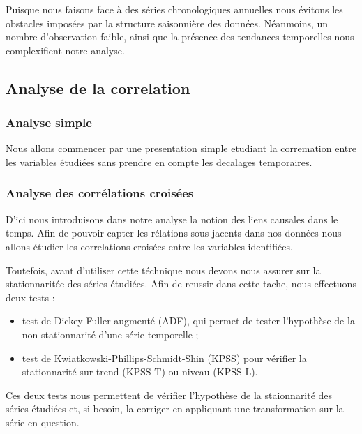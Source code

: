 \documentclass[11pt,]{article}
\providecommand{\tightlist}{%
  \setlength{\itemsep}{0pt}\setlength{\parskip}{0pt}}
\begin{document}
\FloatBarrier

Puisque nous faisons face à des séries chronologiques annuelles nous
évitons les obstacles imposées par la structure saisonnière des données.
Néanmoins, un nombre d'observation faible, ainsi que la présence des
tendances temporelles nous complexifient notre analyse.

\hypertarget{analyse-de-la-correlation}{%
\subsection{Analyse de la correlation}\label{analyse-de-la-correlation}}

\hypertarget{analyse-simple}{%
\subsubsection{Analyse simple}\label{analyse-simple}}

Nous allons commencer par une presentation simple etudiant la
corremation entre les variables étudiées sans prendre en compte les
decalages temporaires.

\hypertarget{analyse-des-correlations-croisees}{%
\subsubsection{Analyse des corrélations
croisées}\label{analyse-des-correlations-croisees}}

D'ici nous introduisons dans notre analyse la notion des liens causales
dans le temps. Afin de pouvoir capter les rélations sous-jacents dans
nos données nous allons étudier les correlations croisées entre les
variables identifiées.

Toutefois, avant d'utiliser cette téchnique nous devons nous assurer sur
la stationnaritée des séries étudiées. Afin de reussir dans cette tache,
nous effectuons deux tests :

\begin{itemize}
\tightlist
\item
  test de Dickey-Fuller augmenté (ADF), qui permet de tester l'hypothèse
  de la non-stationnarité d'une série temporelle ;
\item
  test de Kwiatkowski-Phillips-Schmidt-Shin (KPSS) pour vérifier la
  stationnarité sur trend (KPSS-T) ou niveau (KPSS-L).
\end{itemize}

Ces deux tests nous permettent de vérifier l'hypothèse de la
staionnarité des séries étudiées et, si besoin, la corriger en
appliquant une transformation sur la série en question.
\end{document}
